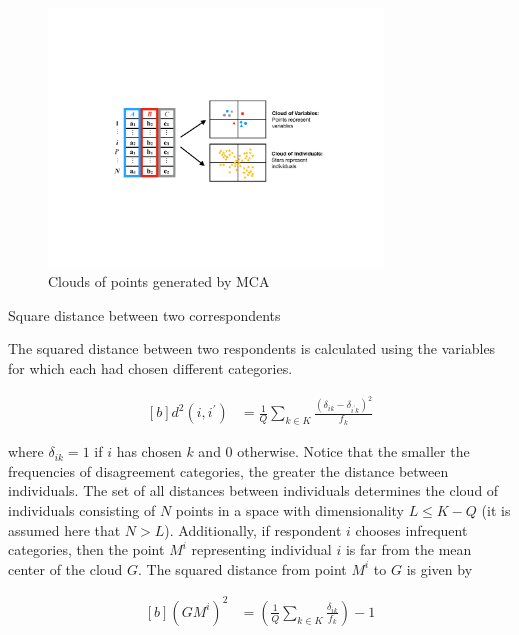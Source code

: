 \documentclass[]{article}
\begin{document}
\begin{figure}[!t] 
\centering 
\includegraphics[width=3.5in]{../figs/mcaIdeaNew.pdf}
\caption{Clouds of points generated by MCA}
\label{fig:fig_MCAillustration} 
\end{figure}

Square distance between two correspondents

The squared distance between two respondents is calculated using the
variables for which each had chosen different categories.

\begin{equation}
\begin{aligned}[b]
\label{eq:distInd}
d^2(i, i^{\prime}) &= \frac{1}{Q} \sum_{k\in K} \frac{(\delta_{ik} - \delta_{i^{\prime}k})^2}{f_k}  
\end{aligned}
\end{equation}

where \(\delta_{ik} = 1\) if \(i\) has chosen \(k\) and \(0\) otherwise.
Notice that the smaller the frequencies of disagreement categories, the
greater the distance between individuals. The set of all distances
between individuals determines the cloud of individuals consisting of
\(N\) points in a space with dimensionality \(L\leq K - Q\)
\cite{greenacre2006multiple} (it is assumed here that \(N > L\)).
Additionally, if respondent \(i\) chooses infrequent categories, then
the point \(M^i\) representing individual \(i\) is far from the mean
center of the cloud \(G\). The squared distance from point \(M^i\) to
\(G\) is given by

\begin{equation}
\begin{aligned}[b]
\label{eq:distGM}
(GM^i)^2 &= \left( \frac{1}{Q} \sum_{k\in K} \frac{\delta_{ik}}{f_k}  \right) -1
\end{aligned}
\end{equation}
\end{document}
